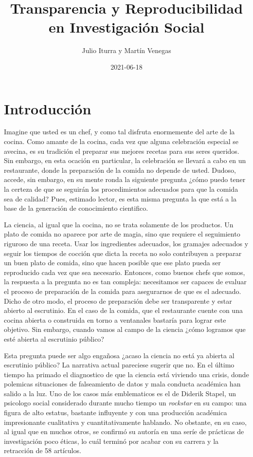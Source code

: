 \documentclass[
]{book}
\title{Transparencia y Reproducibilidad en Investigación Social}
\author{Julio Iturra y Martín Venegas}
\date{2021-06-18}
\begin{document}
\maketitle

{
\setcounter{tocdepth}{1}
\tableofcontents
}
\hypertarget{intro}{%
\chapter{Introducción}\label{intro}}

Imagine que usted es un chef, y como tal disfruta enormemente del arte de la cocina. Como amante de la cocina, cada vez que alguna celebración especial se avecina, es su tradición el preparar sus mejores recetas para sus seres queridos. Sin embargo, en esta ocación en particular, la celebración se llevará a cabo en un restaurante, donde la preparación de la comida no depende de usted. Dudoso, accede, sin embargo, en su mente ronda la siguiente pregunta ¿cómo puedo tener la certeza de que se seguirán los procedimientos adecuados para que la comida sea de calidad? Pues, estimado lector, es esta misma pregunta la que está a la base de la generación de conocimiento cientifico.

La ciencia, al igual que la cocina, no se trata solamente de los productos. Un plato de comida no aparece por arte de magia, sino que requiere el seguimiento riguroso de una receta. Usar los ingredientes adecuados, los gramajes adecuados y seguir los tiempos de cocción que dicta la receta no solo contribuyen a preparar un buen plato de comida, sino que hacen posible que ese plato pueda ser reproducido cada vez que sea necesario. Entonces, como buenos chefs que somos, la respuesta a la pregunta no es tan compleja: necesitamos ser capaces de evaluar el proceso de preparación de la comida para asegurarnos de que es el adecuado. Dicho de otro modo, el proceso de preparación debe ser transparente y estar abierto al escrutinio. En el caso de la comida, que el restaurante cuente con una cocina abierta o construida en torno a ventanales bastaría para lograr este objetivo. Sin embargo, cuando vamos al campo de la ciencia ¿cómo logramos que esté abierta al escrutinio público?

Esta pregunta puede ser algo engañosa ¿acaso la ciencia no está ya abierta al escrutinio público? La narrativa actual pareciese sugerir que no. En el último tiempo ha primado el diagnostico de que la ciencia está viviendo una crisis, donde polemicas situaciones de falseamiento de datos y mala conducta académica han salido a la luz. Uno de los casos más emblematicos es el de Diderik Stapel, un psicologo social considerado durante mucho tiempo un \emph{rockstar} en su campo: una figura de alto estatus, bastante influyente y con una producción académica impresionante cualitativa y cuantitativamente hablando. No obstante, en su caso, al igual que en muchos otros, se confirmó su autoría en una seríe de prácticas de investigación poco éticas, lo cuál terminó por acabar con su carrera y la retracción de 58 artículos.
\end{document}
